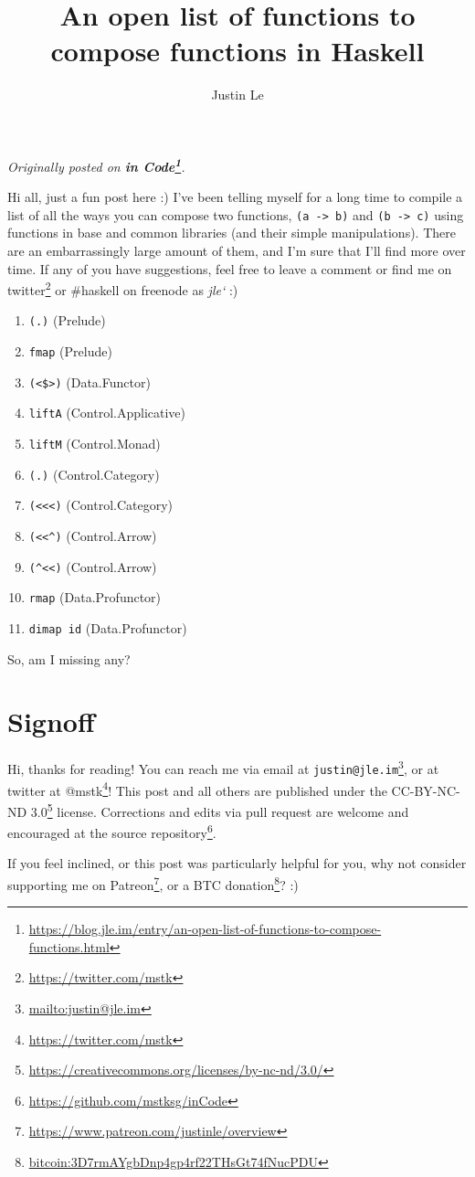 \documentclass[]{article}
\title{An open list of functions to compose functions in Haskell}
\author{Justin Le}
\renewcommand{\href}[2]{#2\footnote{\url{#1}}}
\begin{document}
\maketitle

\emph{Originally posted on
\textbf{\href{https://blog.jle.im/entry/an-open-list-of-functions-to-compose-functions.html}{in
Code}}.}

Hi all, just a fun post here :) I've been telling myself for a long time to
compile a list of all the ways you can compose two functions,
\texttt{(a\ -\textgreater{}\ b)} and \texttt{(b\ -\textgreater{}\ c)} using
functions in base and common libraries (and their simple manipulations). There
are an embarrassingly large amount of them, and I'm sure that I'll find more
over time. If any of you have suggestions, feel free to leave a comment or find
me on \href{https://twitter.com/mstk}{twitter} or \#haskell on freenode as
\emph{jle`} :)

\begin{enumerate}
\def\labelenumi{\arabic{enumi}.}
\tightlist
\item
  \texttt{(.)} (Prelude)
\item
  \texttt{fmap} (Prelude)
\item
  \texttt{(\textless{}\$\textgreater{})} (Data.Functor)
\item
  \texttt{liftA} (Control.Applicative)
\item
  \texttt{liftM} (Control.Monad)
\item
  \texttt{(.)} (Control.Category)
\item
  \texttt{(\textless{}\textless{}\textless{})} (Control.Category)
\item
  \texttt{(\textless{}\textless{}\^{})} (Control.Arrow)
\item
  \texttt{(\^{}\textless{}\textless{})} (Control.Arrow)
\item
  \texttt{rmap} (Data.Profunctor)
\item
  \texttt{dimap\ id} (Data.Profunctor)
\end{enumerate}

So, am I missing any?

\hypertarget{signoff}{%
\section{Signoff}\label{signoff}}

Hi, thanks for reading! You can reach me via email at
\href{mailto:justin@jle.im}{\nolinkurl{justin@jle.im}}, or at twitter at
\href{https://twitter.com/mstk}{@mstk}! This post and all others are published
under the \href{https://creativecommons.org/licenses/by-nc-nd/3.0/}{CC-BY-NC-ND
3.0} license. Corrections and edits via pull request are welcome and encouraged
at \href{https://github.com/mstksg/inCode}{the source repository}.

If you feel inclined, or this post was particularly helpful for you, why not
consider \href{https://www.patreon.com/justinle/overview}{supporting me on
Patreon}, or a \href{bitcoin:3D7rmAYgbDnp4gp4rf22THsGt74fNucPDU}{BTC donation}?
:)
\end{document}
